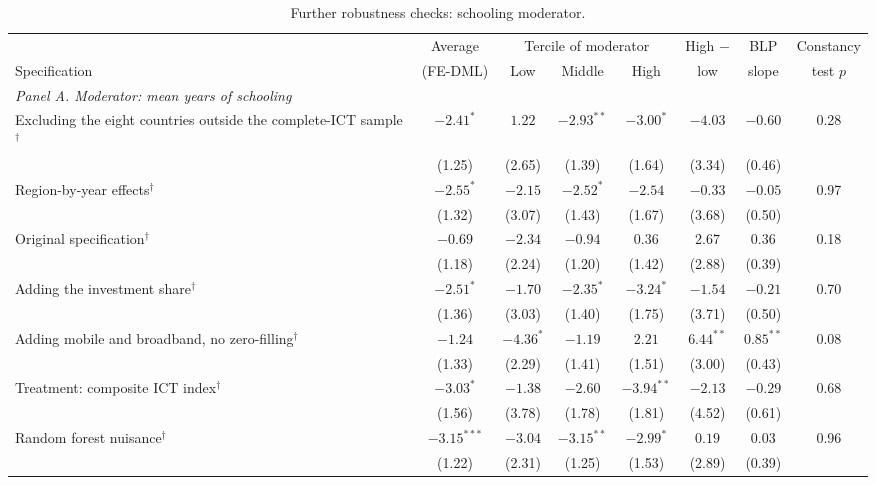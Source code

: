 \documentclass[preprint,12pt,authoryear]{elsarticle}
\begin{document}
\begin{table}[!p]
\centering
\begin{threeparttable}
\caption{Further robustness checks: schooling moderator.}\label{tab:empappa}
\scriptsize
\setlength{\tabcolsep}{3pt}
\begin{tabular}{lccccccc}
\toprule
 & Average & \multicolumn{3}{c}{Tercile of moderator} & High $-$ & BLP & Constancy\\
\cmidrule(lr){3-5}
Specification & (FE-DML) & Low & Middle & High & low & slope & test $p$\\
\midrule
\multicolumn{8}{l}{\textit{Panel A. Moderator: mean years of schooling}}\\
\quad Excluding the eight countries outside the complete-ICT sample$^{\dagger}$ & $-2.41^{*}$ & $1.22$ & $-2.93^{**}$ & $-3.00^{*}$ & $-4.03$ & $-0.60$ & 0.28\\
 & (1.25) & (2.65) & (1.39) & (1.64) & (3.34) & (0.46) & \\
\quad Region-by-year effects$^{\dagger}$ & $-2.55^{*}$ & $-2.15$ & $-2.52^{*}$ & $-2.54$ & $-0.33$ & $-0.05$ & 0.97\\
 & (1.32) & (3.07) & (1.43) & (1.67) & (3.68) & (0.50) & \\
\quad Original specification$^{\dagger}$ & $-0.69$ & $-2.34$ & $-0.94$ & $0.36$ & $2.67$ & $0.36$ & 0.18\\
 & (1.18) & (2.24) & (1.20) & (1.42) & (2.88) & (0.39) & \\
\quad Adding the investment share$^{\dagger}$ & $-2.51^{*}$ & $-1.70$ & $-2.35^{*}$ & $-3.24^{*}$ & $-1.54$ & $-0.21$ & 0.70\\
 & (1.36) & (3.03) & (1.40) & (1.75) & (3.71) & (0.50) & \\
\quad Adding mobile and broadband, no zero-filling$^{\dagger}$ & $-1.24$ & $-4.36^{*}$ & $-1.19$ & $2.21$ & $6.44^{**}$ & $0.85^{**}$ & 0.08\\
 & (1.33) & (2.29) & (1.41) & (1.51) & (3.00) & (0.43) & \\
\quad Treatment: composite ICT index$^{\dagger}$ & $-3.03^{*}$ & $-1.38$ & $-2.60$ & $-3.94^{**}$ & $-2.13$ & $-0.29$ & 0.68\\
 & (1.56) & (3.78) & (1.78) & (1.81) & (4.52) & (0.61) & \\
\quad Random forest nuisance$^{\dagger}$ & $-3.15^{***}$ & $-3.04$ & $-3.15^{**}$ & $-2.99^{*}$ & $0.19$ & $0.03$ & 0.96\\
 & (1.22) & (2.31) & (1.25) & (1.53) & (2.89) & (0.39) & \\

\end{tabular}
\end{threeparttable}
\end{table}
\end{document}
